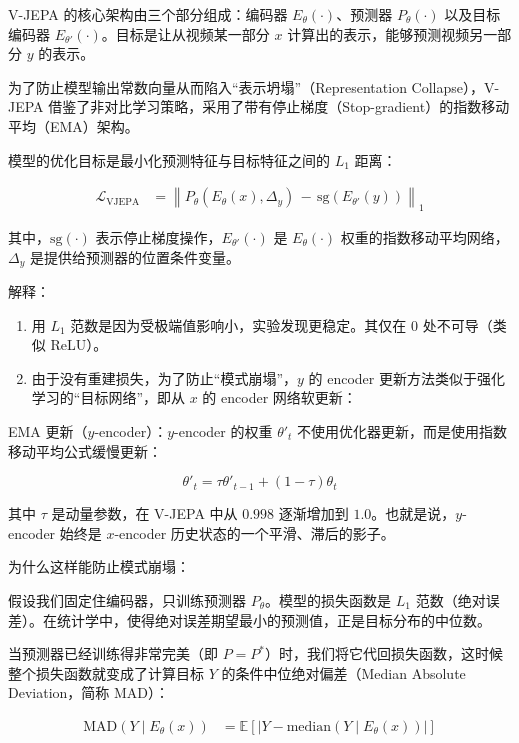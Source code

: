 V-JEPA 的核心架构由三个部分组成：编码器 \(E_\theta(\cdot)\)、预测器 \(P_\theta(\cdot)\) 以及目标编码器 \(E_{\theta'}(\cdot)\)。目标是让从视频某一部分 \(x\) 计算出的表示，能够预测视频另一部分 \(y\) 的表示。

为了防止模型输出常数向量从而陷入``表示坍塌''（Representation Collapse），V-JEPA 借鉴了非对比学习策略，采用了带有停止梯度（Stop-gradient）的指数移动平均（EMA）架构。

模型的优化目标是最小化预测特征与目标特征之间的 \(L_1\) 距离：

\[
\begin{aligned}
\mathcal{L}_{\mathrm{VJEPA}}
&=
\left\|
P_\theta(E_\theta(x),\Delta_y)
\, - \, \mathrm{sg}(E_{\theta'}(y))
\right\|_1
\end{aligned}
\]

其中，\(\mathrm{sg}(\cdot)\) 表示停止梯度操作，\(E_{\theta'}(\cdot)\) 是 \(E_\theta(\cdot)\) 权重的指数移动平均网络，\(\Delta_y\) 是提供给预测器的位置条件变量。

解释：

\begin{enumerate}
\def\labelenumi{\arabic{enumi}.}
\item
  用 \(L_1\) 范数是因为受极端值影响小，实验发现更稳定。其仅在 \(0\) 处不可导（类似 ReLU）。
\item
  由于没有重建损失，为了防止``模式崩塌''，\(y\) 的 encoder 更新方法类似于强化学习的``目标网络''，即从 \(x\) 的 encoder 网络软更新：
\end{enumerate}

EMA 更新（\(y\)-encoder）：\(y\)-encoder 的权重 \(\theta'_t\) 不使用优化器更新，而是使用指数移动平均公式缓慢更新：

\[
\theta'_t=\tau\theta'_{t-1}+(1-\tau)\theta_t
\]

其中 \(\tau\) 是动量参数，在 V-JEPA 中从 \(0.998\) 逐渐增加到 \(1.0\)。也就是说，\(y\)-encoder 始终是 \(x\)-encoder 历史状态的一个平滑、滞后的影子。

为什么这样能防止模式崩塌：

假设我们固定住编码器，只训练预测器 \(P_\theta\)。模型的损失函数是 \(L_1\) 范数（绝对误差）。在统计学中，使得绝对误差期望最小的预测值，正是目标分布的中位数。

当预测器已经训练得非常完美（即 \(P=P^{*}\)）时，我们将它代回损失函数，这时候整个损失函数就变成了计算目标 \(Y\) 的条件中位绝对偏差（Median Absolute Deviation，简称 MAD）：

\[
\begin{aligned}
\mathrm{MAD}(Y\mid E_\theta(x))
&=
\mathbb{E}
\left[
\left|
Y-\mathrm{median}(Y\mid E_\theta(x))
\right|
\right]
\end{aligned}
\]

